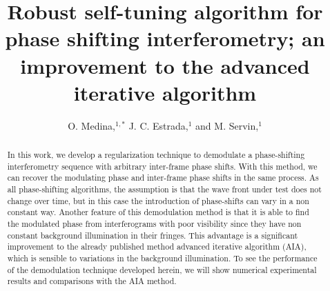 \documentclass[letterpaper,12pt]{article}   %
\begin{document}
\title{Robust self-tuning algorithm for phase shifting interferometry; an improvement to the advanced iterative algorithm}
\author{O. Medina,$^{1,*}$ J. C. Estrada,$^{1}$ and M. Servin,$^{1}$}
\address{$^1$Centro de Investigaciones en Optica A. C., Loma del bosque 115, Col. Lomas del Campestre, Leon Guanajuato,
37150, Mexico}
\address{$^*$Corresponding author: orlandomedina@cio.mx}

\maketitle

\begin{abstract}In this work, we develop a regularization technique to demodulate a phase-shifting interferometry sequence with arbitrary inter-frame phase shifts. With this method, we can recover the modulating phase and inter-frame phase shifts in the same process. As all phase-shifting algorithms, the assumption is that the wave front under test does not change over time, but in this case the introduction of phase-shifts can vary in a non constant way. Another feature of this demodulation method is that it is able to find the modulated phase from interferograms with poor visibility since they have non constant background illumination in their fringes. This advantage is a significant improvement to the already published method advanced iterative algorithm (AIA), which is sensible to variations in the background illumination. To see the performance of the demodulation technique developed herein, we will show numerical experimental results and comparisons with the AIA method.
\end{abstract}
\end{document}
